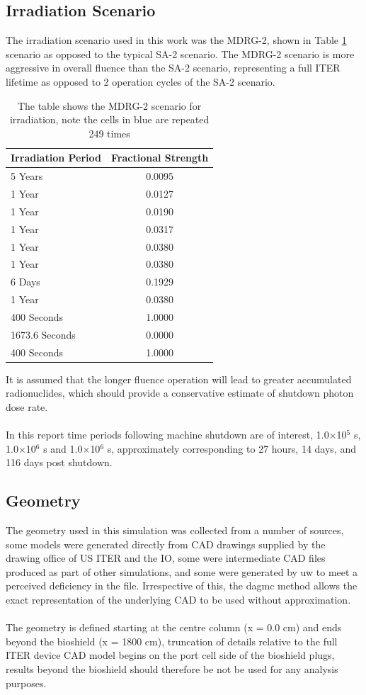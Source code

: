 \documentclass[12pt]{article}
\begin{document}
\subsection{Irradiation Scenario}
The irradiation scenario used in this work was the MDRG-2, shown in Table
\ref{tab:irrad_scenario} scenario as opposed to the typical SA-2 scenario.
The MDRG-2 scenario is more aggressive in overall fluence than the SA-2
scenario, representing a full ITER lifetime as opposed to 2 operation
cycles of the SA-2 scenario.
\begin{table}[ht!]
   \begin{tabular}{| l | c |}
      \hline 
      Irradiation Period & Fractional Strength \\
      \hline
      5 Years & 0.0095 \\
      1 Year  & 0.0127 \\
      1 Year  & 0.0190 \\
      1 Year  & 0.0317 \\
      1 Year  & 0.0380 \\
      1 Year  & 0.0380 \\
      6 Days  & 0.1929 \\
      1 Year  & 0.0380 \\
      \cellcolor{blue!25} 400 Seconds & 1.0000 \\
      \cellcolor{blue!25}1673.6 Seconds & 0.0000 \\
      400 Seconds & 1.0000 \\
      \hline
\end{tabular}
\caption{The table shows the MDRG-2 scenario for irradiation, note the
         cells in \textcolor{blue!25}{blue} are repeated 249 times}
\label{tab:irrad_scenario}
\end{table}
It is assumed that the longer fluence operation will lead to greater accumulated
radionuclides, which should provide a conservative estimate of shutdown photon
dose rate.
\\
\\
In this report time periods following machine shutdown are of interest,
1.0$\times$10$^5$ s, 1.0$\times$10$^6$ s and 1.0$\times$10$^6$ s, approximately
corresponding to 27 hours, 14 days, and 116 days post shutdown.
\subsection{Geometry}
The geometry used in this simulation was collected from a number of sources,
some models were generated directly from CAD drawings supplied by the
drawing office of US ITER and the IO, some were intermediate CAD files produced
as part of other simulations, and some were generated by \gls{uw} to meet a
perceived deficiency in the file. Irrespective of this, the \gls{dagmc} method
allows the exact representation of the underlying CAD to be used without
approximation.
\\
\\
The geometry is defined starting at the centre column (x = 0.0 cm) and ends
beyond the bioshield (x = 1800 cm), truncation of details relative to the full
ITER device CAD model begins on the port cell side of the bioshield plugs,
results beyond the bioshield should therefore be not be used for any
analysis purposes. 
\end{document}
